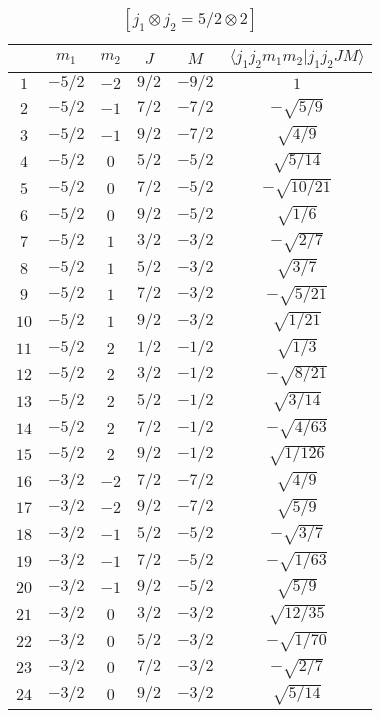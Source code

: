 \begin{table}
\tiny
\caption{$[j_1 \otimes j_2 = 5/2 \otimes 2]$}
\begin{center}
\begin{tabular}{|c|c|c|c|c|c|}
\hline 
   & $m_1$ & $m_2$ & $J$ & $M$ & $\langle j_1 j_2 m_1 m_2 | j_1 j_2 J M \rangle$ \\ 
\hline 
$1$ & $-5/2$ & $-2$ & $9/2$ & $-9/2$ & $1$ \\ 
$2$ & $-5/2$ & $-1$ & $7/2$ & $-7/2$ & $-\sqrt{5/9}$ \\ 
$3$ & $-5/2$ & $-1$ & $9/2$ & $-7/2$ & $\sqrt{4/9}$ \\ 
$4$ & $-5/2$ & $0$ & $5/2$ & $-5/2$ & $\sqrt{5/14}$ \\ 
$5$ & $-5/2$ & $0$ & $7/2$ & $-5/2$ & $-\sqrt{10/21}$ \\ 
$6$ & $-5/2$ & $0$ & $9/2$ & $-5/2$ & $\sqrt{1/6}$ \\ 
$7$ & $-5/2$ & $1$ & $3/2$ & $-3/2$ & $-\sqrt{2/7}$ \\ 
$8$ & $-5/2$ & $1$ & $5/2$ & $-3/2$ & $\sqrt{3/7}$ \\ 
$9$ & $-5/2$ & $1$ & $7/2$ & $-3/2$ & $-\sqrt{5/21}$ \\ 
$10$ & $-5/2$ & $1$ & $9/2$ & $-3/2$ & $\sqrt{1/21}$ \\ 
$11$ & $-5/2$ & $2$ & $1/2$ & $-1/2$ & $\sqrt{1/3}$ \\ 
$12$ & $-5/2$ & $2$ & $3/2$ & $-1/2$ & $-\sqrt{8/21}$ \\ 
$13$ & $-5/2$ & $2$ & $5/2$ & $-1/2$ & $\sqrt{3/14}$ \\ 
$14$ & $-5/2$ & $2$ & $7/2$ & $-1/2$ & $-\sqrt{4/63}$ \\ 
$15$ & $-5/2$ & $2$ & $9/2$ & $-1/2$ & $\sqrt{1/126}$ \\ 
$16$ & $-3/2$ & $-2$ & $7/2$ & $-7/2$ & $\sqrt{4/9}$ \\ 
$17$ & $-3/2$ & $-2$ & $9/2$ & $-7/2$ & $\sqrt{5/9}$ \\ 
$18$ & $-3/2$ & $-1$ & $5/2$ & $-5/2$ & $-\sqrt{3/7}$ \\ 
$19$ & $-3/2$ & $-1$ & $7/2$ & $-5/2$ & $-\sqrt{1/63}$ \\ 
$20$ & $-3/2$ & $-1$ & $9/2$ & $-5/2$ & $\sqrt{5/9}$ \\ 
$21$ & $-3/2$ & $0$ & $3/2$ & $-3/2$ & $\sqrt{12/35}$ \\ 
$22$ & $-3/2$ & $0$ & $5/2$ & $-3/2$ & $-\sqrt{1/70}$ \\ 
$23$ & $-3/2$ & $0$ & $7/2$ & $-3/2$ & $-\sqrt{2/7}$ \\ 
$24$ & $-3/2$ & $0$ & $9/2$ & $-3/2$ & $\sqrt{5/14}$ \\ 

\end{tabular}
\end{center}
\end{table}
